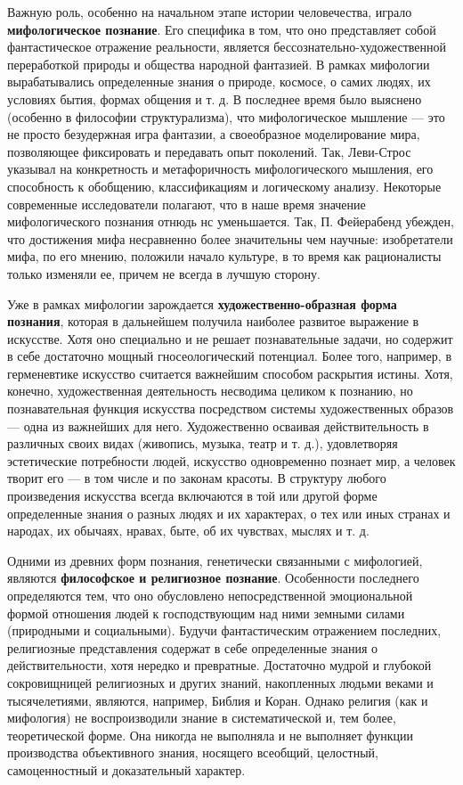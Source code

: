 \documentclass[12pt]{article}
\begin{document}
Важную  роль,  особенно  на  начальном  этапе  истории  человечества,  играло  \textbf{мифологическое  познание}.  Его
специфика в том, что оно представляет собой фантастическое отражение реальности, является бессознательно-художественной переработкой природы и общества народной фантазией. В рамках мифологии вырабатывались
определенные  знания  о природе,  космосе,  о самих  людях, их условиях бытия,  формах  общения и т. д.  В
последнее время было выяснено (особенно в философии структурализма), что мифологическое мышление --- это
не  просто  безудержная  игра  фантазии,  а  своеобразное  моделирование  мира,  позволяющее  фиксировать  и
передавать опыт поколений. Так, Леви-Строс указывал на конкретность и метафоричность мифологического
мышления, его способность к обобщению, классификациям и логическому анализу.
Некоторые  современные  исследователи  полагают,  что  в  наше  время  значение  мифологического  познания
отнюдь нс уменьшается. Так, П. Фейерабенд убежден, что достижения мифа несравненно более значительны
чем научные: изобретатели мифа, по его мнению, положили начало культуре, в то время как рационалисты
только изменяли ее, причем не всегда в лучшую сторону.

Уже  в  рамках  мифологии  зарождается  \textbf{художественно-образная  форма  познания},  которая  в  дальнейшем
получила наиболее развитое выражение в искусстве. Хотя оно специально и не решает познавательные задачи,
но содержит в себе достаточно мощный гносеологический потенциал. Более того, например, в герменевтике
искусство считается важнейшим способом раскрытия истины. Хотя, конечно, художественная деятельность
несводима целиком к познанию, но познавательная функция искусства посредством системы художественных
образов --- одна из важнейших для него. Художественно осваивая действительность в различных своих видах
(живопись, музыка, театр и т. д.), удовлетворяя эстетические потребности людей, искусство одновременно
познает мир, а человек творит его --- в том числе и по законам красоты. В структуру любого произведения
искусства всегда включаются в той или другой форме определенные знания о разных людях и их характерах, о
тех или иных странах и народах, их обычаях, нравах, быте, об их чувствах, мыслях и т. д.

Одними  из  древних  форм  познания,  генетически  связанными  с  мифологией,  являются  \textbf{философское  и
религиозное познание}. Особенности последнего определяются тем, что оно обусловлено непосредственной
эмоциональной  формой  отношения  людей  к  господствующим  над  ними  земными  силами  (природными  и
социальными). Будучи фантастическим отражением последних, религиозные представления содержат в себе
определенные  знания  о  действительности,  хотя  нередко  и  превратные.  Достаточно  мудрой  и  глубокой
сокровищницей  религиозных  и  других  знаний,  накопленных  людьми  веками  и  тысячелетиями,  являются,
например, Библия и Коран. Однако религия (как и мифология) не воспроизводили знание в систематической и,
тем  более,  теоретической  форме.  Она  никогда  не  выполняла  и  не  выполняет  функции  производства
объективного знания, носящего всеобщий, целостный, самоценностный и доказательный характер.
\end{document}
